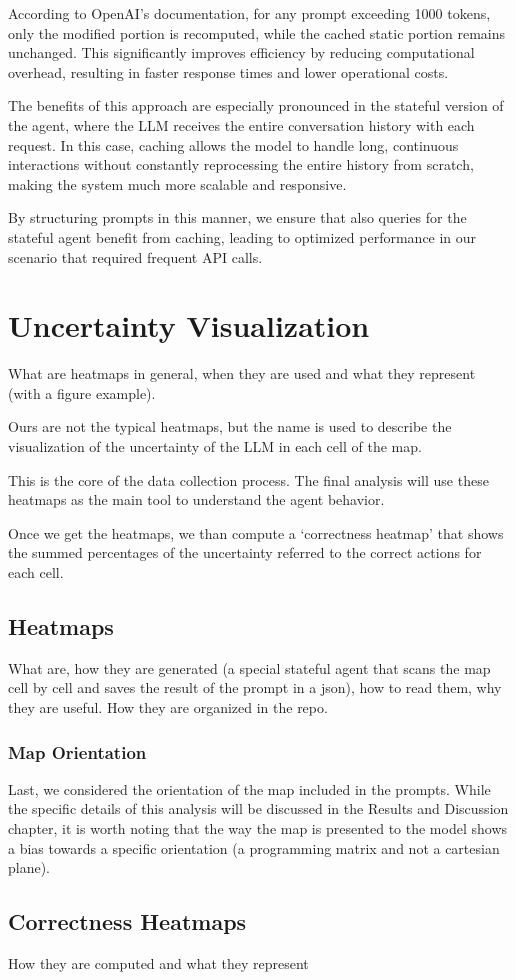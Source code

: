 According to OpenAI's documentation, for any prompt exceeding 1000 tokens, only
the modified portion is recomputed, while the cached static portion remains unchanged.
This significantly improves efficiency by reducing computational overhead, resulting
in faster response times and lower operational costs.

The benefits of this approach are especially pronounced in the stateful version of
the agent, where the LLM receives the entire conversation history with each
request. In this case, caching allows the model to handle long, continuous interactions
without constantly reprocessing the entire history from scratch, making the
system much more scalable and responsive.

By structuring prompts in this manner, we ensure that also queries for the stateful
agent benefit from caching, leading to optimized performance in our scenario
that required frequent API calls.

\section{Uncertainty Visualization}
\label{sec:heatmap_generation}

What are heatmaps in general, when they are used and what they represent (with a
figure example).

Ours are not the typical heatmaps, but the name is used to describe the visualization
of the uncertainty of the LLM in each cell of the map.

This is the core of the data collection process. The final analysis will use
these heatmaps as the main tool to understand the agent behavior.

Once we get the heatmaps, we than compute a `correctness heatmap' that shows the
summed percentages of the uncertainty referred to the correct actions for each cell.

\subsection{Heatmaps}

What are, how they are generated (a special stateful agent that scans the map
cell by cell and saves the result of the prompt in a json), how to read them, why
they are useful. How they are organized in the repo.

\subsubsection{Map Orientation}

Last, we considered the orientation of the map included in the prompts. While the
specific details of this analysis will be discussed in the Results and Discussion
chapter, it is worth noting that the way the map is presented to the model shows
a bias towards a specific orientation (a programming matrix and not a cartesian plane).

\subsection{Correctness Heatmaps}

How they are computed and what they represent